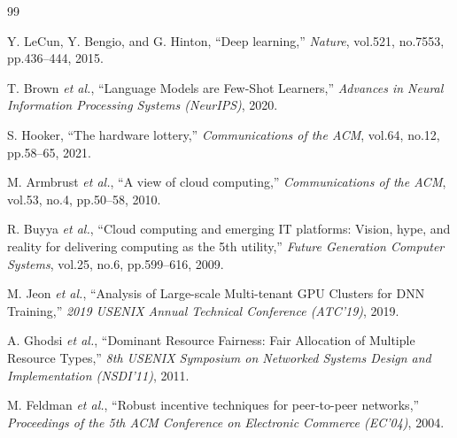 \documentclass[12pt,a4paper]{jsarticle}
\begin{document}
\begin{thebibliography}{99}

  Y. LeCun, Y. Bengio, and G. Hinton,
  ``Deep learning,''
  \textit{Nature}, vol.521, no.7553, pp.436--444, 2015.

  T. Brown \textit{et al.},
  ``Language Models are Few-Shot Learners,''
  \textit{Advances in Neural Information Processing Systems (NeurIPS)}, 2020.

  S. Hooker,
  ``The hardware lottery,''
  \textit{Communications of the ACM}, vol.64, no.12, pp.58--65, 2021.

  M. Armbrust \textit{et al.},
  ``A view of cloud computing,''
  \textit{Communications of the ACM}, vol.53, no.4, pp.50--58, 2010.

  R. Buyya \textit{et al.},
  ``Cloud computing and emerging IT platforms: Vision, hype, and reality for delivering computing as the 5th utility,''
  \textit{Future Generation Computer Systems}, vol.25, no.6, pp.599--616, 2009.

  M. Jeon \textit{et al.},
  ``Analysis of Large-scale Multi-tenant GPU Clusters for DNN Training,''
  \textit{2019 USENIX Annual Technical Conference (ATC'19)}, 2019.

  A. Ghodsi \textit{et al.},
  ``Dominant Resource Fairness: Fair Allocation of Multiple Resource Types,''
  \textit{8th USENIX Symposium on Networked Systems Design and Implementation (NSDI'11)}, 2011.

  M. Feldman \textit{et al.},
  ``Robust incentive techniques for peer-to-peer networks,''
  \textit{Proceedings of the 5th ACM Conference on Electronic Commerce (EC'04)}, 2004.

\end{thebibliography}
\end{document}
